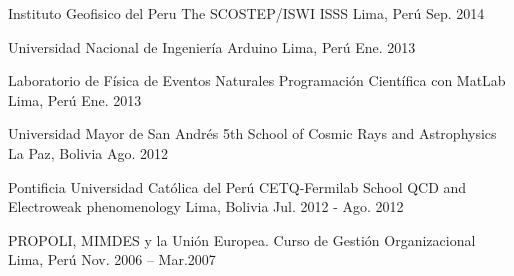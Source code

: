 
\begin{cventries}

  \cventry
    {Instituto Geofisico del Peru} %
    {The SCOSTEP/ISWI ISSS} %
    {Lima, Perú} %
    {Sep. 2014} %
    {}

  \cventry
    {Universidad Nacional de Ingeniería} %
    {Arduino} %
    {Lima, Perú} %
    {Ene. 2013} %
    {}

  \cventry
    {Laboratorio de Física de Eventos Naturales} %
    {Programación Científica con MatLab} %
    {Lima, Perú} %
    {Ene. 2013} %
    {}

  \cventry
    {Universidad Mayor de San Andrés} %
    {5th School of Cosmic Rays and Astrophysics} %
    {La Paz, Bolivia} %
    {Ago. 2012} %
    {}

  \cventry
    {Pontificia Universidad Católica del Perú} %
    {CETQ-Fermilab School QCD and Electroweak phenomenology} %
    {Lima, Bolivia} %
    {Jul. 2012 - Ago. 2012} %
    {}

  \cventry
    {PROPOLI, MIMDES y la Unión Europea.} %
    {Curso de Gestión Organizacional} %
    {Lima, Perú} %
    {Nov. 2006 – Mar.2007} %
    {}

\end{cventries}
